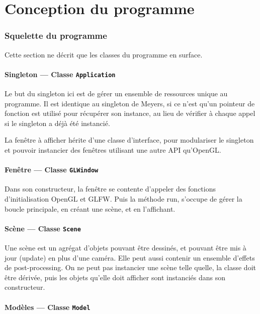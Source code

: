 \documentclass[pdftex, 11pt, a4paper, titlepage]{article}
\begin{document}
\pagebreak
{}
\part{Conception du programme}

\section{Squelette du programme}

Cette section ne décrit que les classes du programme en surface.

\subsection{Singleton --- Classe \texttt{Application}}

Le but du singleton ici est de gérer un ensemble de ressources unique
au programme.  Il est identique au singleton de Meyers, si ce n'est
qu'un pointeur de fonction est utilisé pour récupérer son instance, au
lieu de vérifier à chaque appel si le singleton a déjà été instancié.

La fenêtre à afficher hérite d'une classe d'interface, pour
modulariser le singleton et pouvoir instancier des fenêtres utilisant
une autre API qu'OpenGL.

\subsection{Fenêtre --- Classe \texttt{GLWindow}}

Dans son constructeur, la fenêtre se contente d'appeler des fonctions
d'initialisation OpenGL et GLFW. Puis la méthode run, s'occupe de
gérer la boucle principale, en créant une scène, et en l'affichant.

\subsection{Scène --- Classe \texttt{Scene}}

Une scène est un agrégat d'objets pouvant être dessinés, et pouvant
être mis à jour (update) en plus d'une caméra.  Elle peut aussi
contenir un ensemble d'effets de post-processing. On ne peut pas
instancier une scène telle quelle, la classe doit être dérivée,
puis les objets qu'elle doit afficher sont instanciés dans son
constructeur.

\subsection{Modèles --- Classe \texttt{Model}}
\end{document}
